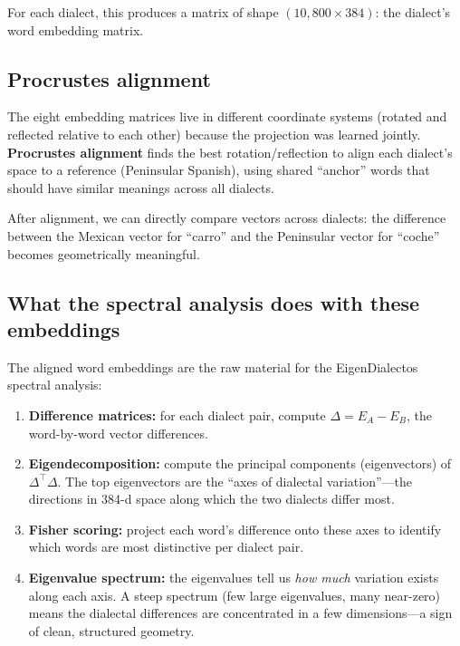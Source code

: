 \documentclass[11pt,a4paper]{article}
\theoremstyle{definition}
\begin{document}
For each dialect, this produces a matrix of shape
$(10{,}800 \times 384)$: the dialect's word embedding matrix.

\subsection{Procrustes alignment}

The eight embedding matrices live in different coordinate systems
(rotated and reflected relative to each other) because the projection
was learned jointly. \textbf{Procrustes alignment} finds the best
rotation/reflection to align each dialect's space to a reference
(Peninsular Spanish), using shared ``anchor'' words that should have
similar meanings across all dialects.

After alignment, we can directly compare vectors across dialects: the
difference between the Mexican vector for ``carro'' and the Peninsular
vector for ``coche'' becomes geometrically meaningful.

\subsection{What the spectral analysis does with these embeddings}

The aligned word embeddings are the raw material for the EigenDialectos
spectral analysis:

\begin{enumerate}
  \item \textbf{Difference matrices:} for each dialect pair, compute
        $\Delta = E_A - E_B$, the word-by-word vector differences.

  \item \textbf{Eigendecomposition:} compute the principal components
        (eigenvectors) of $\Delta^\top \Delta$. The top eigenvectors
        are the ``axes of dialectal variation''---the directions in
        384-d space along which the two dialects differ most.

  \item \textbf{Fisher scoring:} project each word's difference onto
        these axes to identify which words are most distinctive per
        dialect pair.

  \item \textbf{Eigenvalue spectrum:} the eigenvalues tell us
        \emph{how much} variation exists along each axis. A steep
        spectrum (few large eigenvalues, many near-zero) means the
        dialectal differences are concentrated in a few dimensions---a
        sign of clean, structured geometry.
\end{enumerate}
\end{document}
